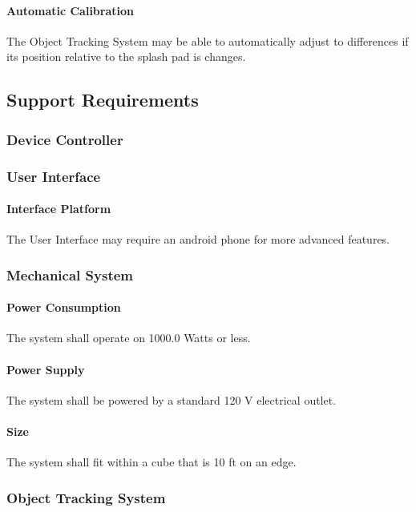 \paragraph{Automatic Calibration}
The Object Tracking System may be able to automatically adjust to differences if its position relative to the splash pad is changes. 

\subsection{Support Requirements}

\subsubsection{Device Controller}

\subsubsection{User Interface}

\paragraph{Interface Platform}
The User Interface may require an android phone for more advanced features. 

\subsubsection{Mechanical System}

\paragraph{Power Consumption}
The system shall operate on 1000.0 Watts or less.

\paragraph{Power Supply}
The system shall be powered by a standard 120 V electrical outlet. 

\paragraph{Size}
The system shall fit within a cube that is 10 ft on an edge.

\subsubsection{Object Tracking System}

